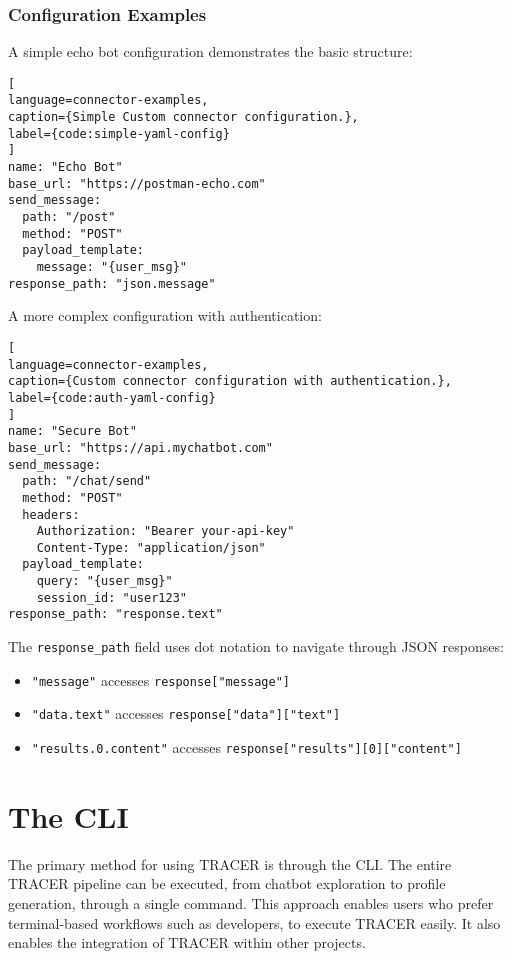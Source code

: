 \subsubsection{Configuration Examples}

A simple echo bot configuration demonstrates the basic structure:

\begin{lstlisting}[
language=connector-examples,
caption={Simple Custom connector configuration.},
label={code:simple-yaml-config}
]
name: "Echo Bot"
base_url: "https://postman-echo.com"
send_message:
  path: "/post"
  method: "POST"
  payload_template:
    message: "{user_msg}"
response_path: "json.message"
\end{lstlisting}

A more complex configuration with authentication:

\begin{lstlisting}[
language=connector-examples,
caption={Custom connector configuration with authentication.},
label={code:auth-yaml-config}
]
name: "Secure Bot"
base_url: "https://api.mychatbot.com"
send_message:
  path: "/chat/send"
  method: "POST"
  headers:
    Authorization: "Bearer your-api-key"
    Content-Type: "application/json"
  payload_template:
    query: "{user_msg}"
    session_id: "user123"
response_path: "response.text"
\end{lstlisting}

The \texttt{response\_path} field uses dot notation to navigate through \ac{JSON} responses:
\begin{itemize}
  \item \texttt{"message"} accesses \texttt{response["message"]}
  \item \texttt{"data.text"} accesses \texttt{response["data"]["text"]}
  \item \texttt{"results.0.content"} accesses
\texttt{response["results"][0]["content"]}
\end{itemize}


\section{The \acl{CLI}}

The primary method for using \ac{TRACER} is through the \ac{CLI}.
The entire \ac{TRACER} pipeline can be executed,
from chatbot exploration to profile generation,
through a single command.
This approach enables users who prefer terminal-based workflows
such as developers, to execute TRACER easily.
It also enables the integration of \ac{TRACER} within other projects.

